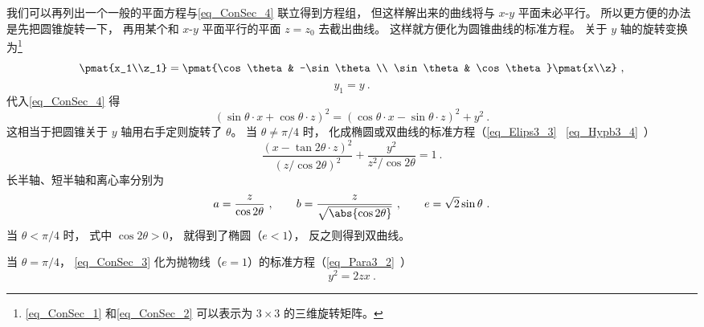我们可以再列出一个一般的平面方程与\autoref{eq_ConSec_4} 联立得到方程组， 但这样解出来的曲线将与 $x$-$y$ 平面未必平行。 所以更方便的办法是先把圆锥旋转一下， 再用某个和 $x$-$y$ 平面平行的平面 $z = z_0$ 去截出曲线。 这样就方便化为圆锥曲线的标准方程。 关于 $y$ 轴的旋转变换为\footnote{\autoref{eq_ConSec_1} 和\autoref{eq_ConSec_2} 可以表示为 $3\times 3$ 的三维旋转矩阵。}
\begin{equation}\label{eq_ConSec_1}
\pmat{x_1\\z_1} = \pmat{\cos\theta & -\sin\theta\\ \sin\theta & \cos\theta}\pmat{x\\z}~,
\end{equation}
\begin{equation}\label{eq_ConSec_2}
y_1 = y~.
\end{equation}
代入\autoref{eq_ConSec_4} 得
\begin{equation}\label{eq_ConSec_3}
(\sin\theta\cdot x + \cos\theta\cdot z)^2 = (\cos\theta\cdot x - \sin\theta\cdot z)^2 + y^2~.
\end{equation}
这相当于把圆锥关于 $y$ 轴用右手定则旋转了 $\theta$。 当 $\theta \ne \pi/4$ 时， 化成椭圆或双曲线的标准方程（\autoref{eq_Elips3_3}~ \autoref{eq_Hypb3_4}~）
\begin{equation}
\frac{(x - \tan2\theta \cdot z)^2}{(z/\cos2\theta)^2} + \frac{y^2}{z^2/\cos2\theta} = 1~.
\end{equation}
长半轴、短半轴和离心率分别为
\begin{equation}
a = \frac{z}{\cos2\theta}~,
\qquad
b = \frac{z}{\sqrt{\abs{\cos2\theta}}}~,
\qquad
e = \sqrt{2}\sin\theta~.
\end{equation}
当 $\theta < \pi/4$ 时， 式中 $\cos2\theta > 0$， 就得到了椭圆（$e < 1$）， 反之则得到双曲线。

当 $\theta = \pi/4$， \autoref{eq_ConSec_3} 化为抛物线（$e = 1$）的标准方程（\autoref{eq_Para3_2}~）
\begin{equation}
y^2 = 2zx~.
\end{equation}
